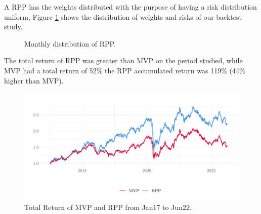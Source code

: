 A RPP has the weights distributed with the purpose of having a risk distribution uniform, Figure \ref{fig:totalRiskPPP} shows the distribution of weights and risks of our backtest study.

\begin{figure}[H]
	\begin{subfigmatrix}{2}
	\end{subfigmatrix}
	\caption{Monthly distribution of RPP.}
	\label{fig:totalRiskPPP}
\end{figure}

The total return of RPP was greater than MVP on the period studied,  while MVP had a total return of 52\% the RPP accumulated return was 119\% (44\% higher than MVP).

\begin{figure}[H]
	\centering
	\includegraphics{figures/retornoRPPMVP.pdf}
	\caption{Total Return of MVP and RPP from Jan17 to Jun22.}
	\label{fig:retornoRPPMVP}
\end{figure}

